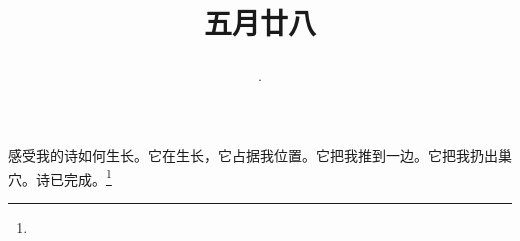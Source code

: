 \title{\date[d=3,m=7,y=2024][year:cn-y,年,month:cn,day:cn,日,·,weekday]·五月廿八 }
感受我的诗如何生长。它在生长，它占据我位置。它把我推到一边。它把我扔出巢穴。诗已完成。\footnote{ }

